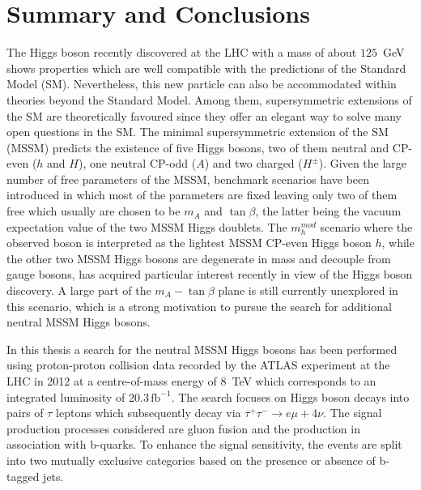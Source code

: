 \chapter{Summary and Conclusions}\label{chap:conclusion}
The  Higgs boson recently discovered  at the LHC 
with a mass of about $125$~GeV shows properties which are well compatible with the  predictions of
the Standard Model (SM). Nevertheless, this new particle can also
be accommodated within theories beyond the Standard Model. Among  them, 
supersymmetric extensions of the SM are  theoretically favoured 
since they offer an elegant way to solve many open questions in the SM.
The minimal supersymmetric extension of the SM (MSSM) predicts the existence
of five Higgs bosons, two of them neutral and CP-even ($h$ and $H$), one neutral CP-odd ($A$) and two charged ($H^{\pm}$).
Given the large number of free parameters of the MSSM, 
benchmark scenarios have been introduced in which  most of the 
parameters are fixed leaving only two of them free which usually are chosen to be $m_A$ and $\tan\beta$,
the latter being the vacuum expectation value of the two MSSM Higgs doublets.
The $m_h^{mod}$ scenario where the observed boson is interpreted as 
the lightest MSSM CP-even Higgs boson $h$, while the other two MSSM Higgs bosons are  degenerate in mass
and decouple from gauge bosons, has acquired particular interest recently
in view of the Higgs boson discovery. 
A large part of the $m_A - \tan\beta$ plane is still currently         
unexplored  in this scenario, which is a strong motivation to pursue 
the search for additional neutral MSSM Higgs bosons.


In this thesis a search for the neutral MSSM Higgs bosons has been performed using proton-proton collision data
recorded by the ATLAS experiment at the LHC in 2012 at a centre-of-mass energy
of 8~TeV which corresponds to an integrated luminosity of 20.3$\,\text{fb}^{-1}$. The search focuses on  Higgs boson decays
into pairs of $\tau$ leptons which subsequently decay via  $\tau^+ \tau^- \rightarrow e \mu +4\nu$.
The signal production processes considered are gluon fusion and the production in association with b-quarks. To enhance the signal 
sensitivity,  the  events are split into two mutually exclusive categories based on the presence
or absence of b-tagged jets.
 
